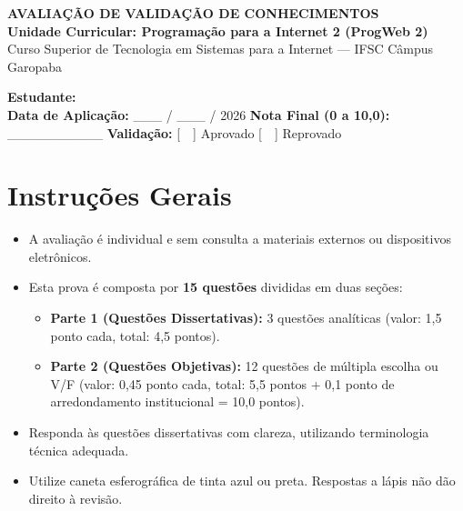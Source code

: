 \begin{center}
    {\Large \textbf{AVALIAÇÃO DE VALIDAÇÃO DE CONHECIMENTOS}}\\
    \vspace{0.15cm}
    {\large \textbf{Unidade Curricular: Programação para a Internet 2 (ProgWeb 2)}}\\
    \small Curso Superior de Tecnologia em Sistemas para a Internet --- IFSC Câmpus Garopaba\\[0.15cm]
    \iftoggle{gabarito}{\textbf{\color{corGabarito}\large [GABARITO OFICIAL COMENTADO \& RUBRICAS DE PONTUAÇÃO]}}{}
\end{center}

\vspace{0.2cm}

\begin{tcolorbox}[colback=white, colframe=azulTitulo!70, boxrule=0.8pt, arc=4pt]
    \textbf{Estudante:} \ifthenelse{\equal{\nomeEstudante}{}}{\hrulefill}{\textbf{\large \nomeEstudante} \hrulefill} \\
    \vspace{0.25cm}
    \textbf{Data de Aplicação:} \_\_\_ / \_\_\_ / 2026 \hspace{1.5cm} 
    \textbf{Nota Final (0 a 10,0):} \_\_\_\_\_\_\_\_\_\_ \hspace{1.5cm} 
    \textbf{Validação:} [~~] Aprovado [~~] Reprovado
\end{tcolorbox}

\vspace{0.1cm}

\section*{Instruções Gerais}
\begin{itemize}[leftmargin=*]
    \item A avaliação é individual e sem consulta a materiais externos ou dispositivos eletrônicos.
    \item Esta prova é composta por \textbf{15 questões} divididas em duas seções:
    \begin{itemize}
        \item \textbf{Parte 1 (Questões Dissertativas):} 3 questões analíticas (valor: 1,5 ponto cada, total: 4,5 pontos).
        \item \textbf{Parte 2 (Questões Objetivas):} 12 questões de múltipla escolha ou V/F (valor: 0,45 ponto cada, total: 5,5 pontos + 0,1 ponto de arredondamento institucional = 10,0 pontos).
    \end{itemize}
    \item Responda às questões dissertativas com clareza, utilizando terminologia técnica adequada.
    \item Utilize caneta esferográfica de tinta azul ou preta. Respostas a lápis não dão direito à revisão.
\end{itemize}


